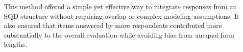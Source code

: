This method offered a simple yet effective way to integrate responses from an SQD structure without requiring overlap or complex modeling assumptions. It also ensured that items answered by more respondents contributed more substantially to the overall evaluation while avoiding bias from unequal form lengths.
